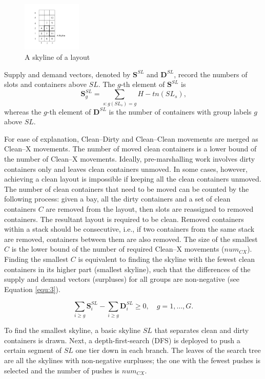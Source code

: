 \documentclass[review,3p,times,authoryear,12pt]{elsarticle}
\begin{document}
\begin{figure}[!htb]
\centering
\includegraphics[width=0.25\textwidth]{fig5.pdf}
\caption{A skyline of a layout}
\label{fig5}
\end{figure}

Supply and demand vectors, denoted by $\mathbf S^\mathit{SL}$ and $\mathbf D^\mathit{SL}$, record the numbers of slots and containers above $\mathit{SL}$.
The $g$-th element of $\mathbf S^\mathit{SL}$ is
\[
\mathbf S^\mathit{SL}_g=\sum_{s:g(\mathit{SL}_s)=g}H-\mathit{tn}(\mathit{SL}_s)\textrm{,}
\]
whereas the $g$-th element of $\mathbf D^\mathit{SL}$ is the number of containers with group labels $g$ above $\mathit{SL}$.

For ease of explanation, Clean--Dirty and Clean--Clean movements are merged as Clean--X movements.
The number of moved clean containers is a lower bound of the number of Clean--X movements.
Ideally, pre-marshalling work involves dirty containers only and leaves clean containers unmoved.
In some cases, however, achieving a clean layout is impossible if keeping all the clean containers unmoved.
The number of clean containers that need to be moved can be counted by the following process: given a bay, all the dirty containers and a set of clean containers $C$ are removed from the layout, then slots are reassigned to removed containers.
The resultant layout is required to be clean.
Removed containers within a stack should be consecutive, i.e., if two containers from the same stack are removed, containers between them are also removed.
The size of the smallest $C$ is the lower bound of the number of required Clean--X movements ($\mathit{num}_{CX}$).
Finding the smallest $C$ is equivalent to finding the skyline with the fewest clean containers in its higher part (smallest skyline), such that the differences of the supply and demand vectors (surpluses) for all groups are non-negative (see Equation \ref{equ:3}).

\begin{equation}
\label{equ:3}
\sum_{i\ge g}\mathbf S^\mathit{SL}_i-\sum_{i\ge g}\mathbf D^\mathit{SL}_i\ge0, \quad g=1,\dots,G\textrm{.}
\end{equation}

To find the smallest skyline, a basic skyline $\mathit{SL}$ that separates clean and dirty containers is drawn.
Next, a depth-first-search (DFS) is deployed to push a certain segment of $\mathit{SL}$ one tier down in each branch.
The leaves of the search tree are all the skylines with non-negative surpluses; the one with the fewest pushes is selected and the number of pushes is $\mathit{num}_\mathit{CX}$.
\end{document}
